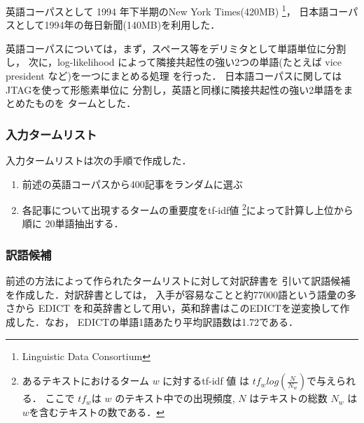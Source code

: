 英語コーパスとして 1994 年下半期のNew York Times(420MB)
\footnote{Linguistic Data Consortium}，
日本語コーパスとして1994年の毎日新聞(140MB)を利用した． 

英語コーパスについては，まず，スペース等をデリミタとして単語単位に分割し，
次に，log-likelihood によって隣接共起性の強い2つの単語(たとえば vice 
president など)を一つにまとめる処理 \cite{Dunning93}
を行った． 
日本語コーパスに関してはJTAG\cite{Fuchi97j}を使って形態素単位に
分割し，英語と同様に隣接共起性の強い2単語をまとめたものを
タームとした． 

\subsubsection{入力タームリスト}

  入力タームリストは次の手順で作成した． 

\begin{enumerate}
\item 前述の英語コーパスから400記事をランダムに選ぶ
\item 各記事について出現するタームの重要度をtf-idf値
\footnote{あるテキストにおけるターム $w $ に対するtf-idf 値 は
 $ tf_w log(\frac{N}{N_w}) $で与えられる．
ここで  $ tf_w $は
$ w $ のテキスト中での出現頻度, $ N $ はテキストの総数
$ N_w $ は $ w $を含むテキストの数である．
}によって計算し上位から順に 20単語抽出する．
\end{enumerate}

\subsubsection{訳語候補}

  前述の方法によって作られたタームリストに対して対訳辞書を
引いて訳語候補を作成した．対訳辞書としては，
入手が容易なことと約77000語という語彙の多さから EDICT\cite{Breen95}
を和英辞書として用い，英和辞書はこのEDICTを逆変換して作成した．なお，
EDICTの単語1語あたり平均訳語数は1.72である．

